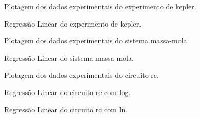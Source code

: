 \documentclass{article}
\begin{document}
\begin{figure}[H]
    \caption{Plotagem dos dados experimentais do experimento de kepler.}
    \label{fig:kepler 1}
    \begin{center}
    
    \end{center}
\end{figure}

\begin{figure}[H]
    \caption{Regressão Linear do experimento de kepler.}
    \label{fig:kepler 2}
    \begin{center}
    
    \end{center}
\end{figure}

\begin{figure}[H]
    \caption{Plotagem dos dados experimentais do sistema massa-mola.}
    \label{fig:massa-mola 1}
    \begin{center}
    
    \end{center}
\end{figure}

\begin{figure}[H]
    \caption{Regressão Linear do sistema massa-mola.}
    \label{fig:massa-mola 1}
    \begin{center}
    
    \end{center}
\end{figure}

\begin{figure}[H]
    \caption{Plotagem dos dados experimentais do circuito rc.}
    \label{fig:rc 1}
    \begin{center}
    
    \end{center}
\end{figure}

\begin{figure}[H]
    \caption{Regressão Linear do circuito rc com log.}
    \label{fig:rc 2}
    \begin{center}
    
    \end{center}
\end{figure}

\begin{figure}[H]
    \caption{Regressão Linear do circuito rc com ln.}
    \label{fig:rc 3}
    \begin{center}
    
    \end{center}
\end{figure}

\clearpage
{}
\printbibliography
\end{document}
